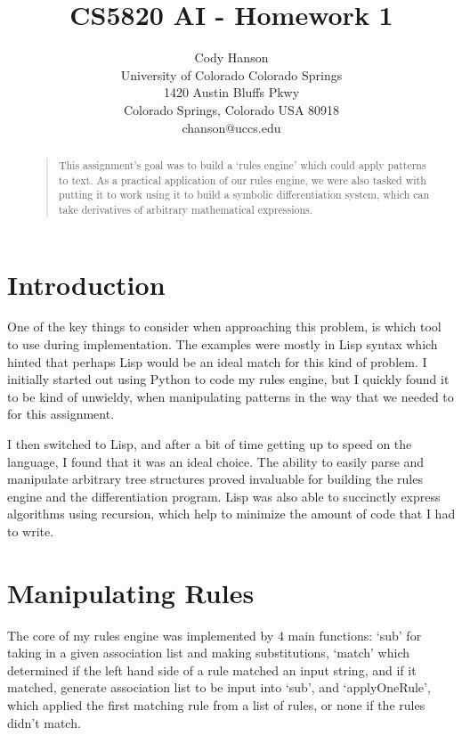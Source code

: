 \documentclass[letterpaper]{article}
\begin{document}
\title{CS5820 AI - Homework 1}
\author{Cody Hanson\\
University of Colorado Colorado Springs\\
1420 Austin Bluffs Pkwy\\
Colorado Springs, Colorado USA 80918\\
chanson@uccs.edu}
\maketitle
\begin{abstract}
\begin{quote}
This assignment's goal was to build a `rules engine' which could apply patterns to text.
As a practical application of our rules engine, we were also tasked with putting it to work using it
to build a symbolic differentiation system, which can take derivatives of arbitrary mathematical expressions.
\end{quote}
\end{abstract}

\section{Introduction}
One of the key things to consider when approaching this problem, is which
tool to use during implementation. The examples were mostly in Lisp syntax
which hinted that perhaps Lisp would be an ideal match for this kind
of problem. I initially started out using Python to code my rules engine,
but I quickly found it to be kind of unwieldy, when manipulating patterns in
the way that we needed to for this assignment.

I then switched to Lisp, and after a bit of time getting up to speed on the
language, I found that it was an ideal choice. The ability to easily parse 
and manipulate arbitrary tree structures proved invaluable for building the
rules engine and the differentiation program. Lisp was also able to
succinctly express algorithms using recursion, which help to minimize
the amount of code that I had to write.

\section{Manipulating Rules}
The core of my rules engine was implemented by 4 main functions: `sub' for
taking in a given association list and making substitutions, `match' which determined
if the left hand side of a rule matched an input string, and if it matched, generate
association list to be input into `sub', and `applyOneRule', which applied the first
matching rule from a list of rules, or none if the rules didn't match.
\end{document}

